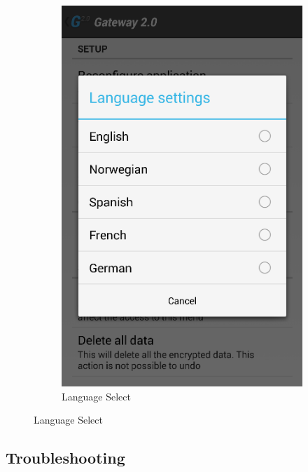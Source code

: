 \begin{figure}[H]
\begin{subfigure}[b]{0.49\textwidth}
        \includegraphics[width=\textwidth]{img/interface/16-Language.png}
        \caption*{Language Select}
        \label{fig:16language}
    \end{subfigure}
\end{figure}

\newpage
\subsection*{Troubleshooting}

